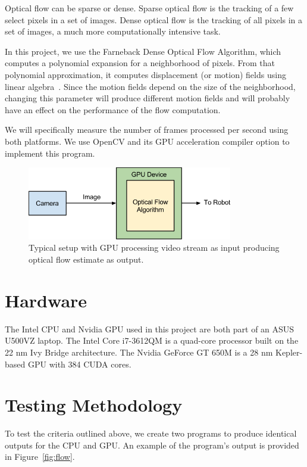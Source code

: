 \documentclass[12pt,letterpaper]{article}
\begin{document}
Optical flow can be sparse or dense. Sparse optical flow is the tracking of
a few select pixels in a set of images. Dense optical flow is the tracking of
all pixels in a set of images, a much more computationally intensive task.

In this project, we use the Farneback Dense Optical Flow Algorithm, which
computes a polynomial expansion for a neighborhood of pixels. From that
polynomial approximation, it computes displacement (or motion) fields using
linear algebra~\cite{farneback}. Since the motion fields depend on the size of
the neighborhood, changing this parameter will produce different motion fields
and will probably have an effect on the performance of the flow computation.

We will specifically measure the number of frames processed per second using
both platforms. We use OpenCV and its GPU acceleration compiler option to
implement this program.

\begin{figure}[H]
  \centering
  \includegraphics[width=0.8\textwidth]{img/sys.png}
  \caption{Typical setup with GPU processing video stream as input producing optical flow estimate as output.}
  \label{fig:sys}
\end{figure}

\section{Hardware}
The Intel CPU and Nvidia GPU used in this project are both part of an ASUS
U500VZ laptop. The Intel Core i7-3612QM is a quad-core processor built on the 22
nm Ivy Bridge architecture. The Nvidia GeForce GT 650M is a 28 nm Kepler-based
GPU with 384 CUDA cores.

\section{Testing Methodology}
To test the criteria outlined above, we create two programs to produce
identical outputs for the CPU and GPU. An example of the program's output is
provided in Figure~\ref{fig:flow}.
\end{document}
